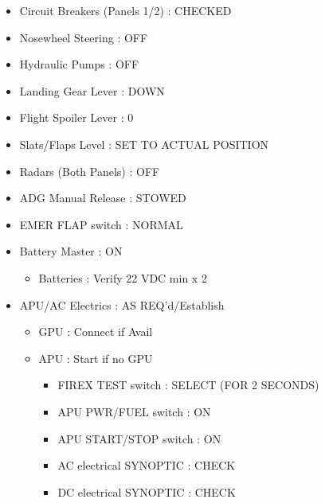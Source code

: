 \begin{itemize}
\item Circuit Breakers (Panels 1\slash 2) : CHECKED

\item Nosewheel Steering : OFF

\item Hydraulic Pumps : OFF

\item Landing Gear Lever : DOWN

\item Flight Spoiler Lever : 0

\item Slats\slash Flaps Level : SET TO ACTUAL POSITION

\item Radars (Both Panels) : OFF

\item ADG Manual Release : STOWED

\item EMER FLAP switch : NORMAL

\item Battery Master : ON

\begin{itemize}
\item Batteries : Verify 22 VDC min x 2

\end{itemize}

\item APU\slash AC Electrics : AS REQ'd\slash Establish

\begin{itemize}
\item GPU : Connect if Avail

\item APU : Start if no GPU

\begin{itemize}
\item FIREX TEST switch : SELECT (FOR 2 SECONDS)

\item APU PWR\slash FUEL switch : ON

\item APU START\slash STOP switch : ON

\item AC electrical SYNOPTIC : CHECK

\item DC electrical SYNOPTIC : CHECK

\end{itemize}


\end{itemize}
\end{itemize}
